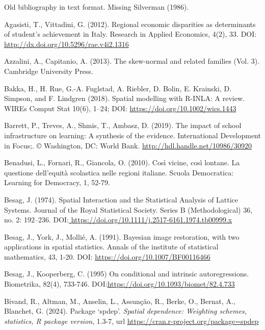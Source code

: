 \documentclass{article}
\begin{document}
Old bibliography in text format. Missing Silverman (1986).
\begin{thebibliography}{99}

Agasisti, T., Vittadini, G. (2012). Regional economic disparities as determinants of student's achievement in Italy. Research in Applied Economics, 4(2), 33. DOI: \url{http://dx.doi.org/10.5296/rae.v4i2.1316 }

Azzalini, A., Capitanio, A. (2013). The skew-normal and related families (Vol. 3). Cambridge University Press.

Bakka, H., H. Rue, G.-A. Fuglstad, A. Riebler, D. Bolin, E. Krainski, D. Simpson, and F. Lindgren (2018). Spatial modelling with R-INLA: A review. WIREs Comput Stat 10(6), 1–24; DOI: \url{https://doi.org/10.1002/wics.1443}

Barrett, P., Treves, A., Shmis, T., Ambasz, D. (2019). The impact of school infrastructure on learning: A synthesis of the evidence. International Development in Focus;. © Washington, DC: World Bank. \url{http://hdl.handle.net/10986/30920}

Benadusi, L., Fornari, R.,  Giancola, O. (2010). Così vicine, così lontane. La questione dell’equità scolastica nelle regioni italiane. Scuola Democratica: Learning for Democracy, 1, 52-79.

Besag, J. (1974). Spatial Interaction and the Statistical Analysis of Lattice Systems. Journal of the Royal Statistical Society. Series B (Methodological) 36, no. 2: 192–236. DOI:\url{ https://doi.org/10.1111/j.2517-6161.1974.tb00999.x}

Besag, J., York, J., Mollié, A. (1991). Bayesian image restoration, with two applications in spatial statistics. Annals of the institute of statistical mathematics, 43, 1-20. DOI: \url{https://doi.org/10.1007/BF00116466}

Besag, J., Kooperberg, C. (1995) On conditional and intrinsic autoregressions. Biometrika, 82(4), 733-746. DOI:\url{https://doi.org/10.1093/biomet/82.4.733}

Bivand, R., Altman, M., Anselin, L., Assunção, R., Berke, O., Bernat, A., Blanchet, G. (2024). Package ‘spdep’. \textit{Spatial dependence: Weighting schemes, statistics, R package version}, 1.3-7, url \url{https://cran.r-project.org/package=spdep} 


\end{thebibliography}
\end{document}
